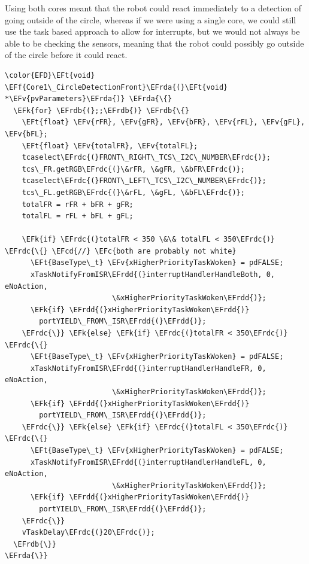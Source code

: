 \documentclass[11pt]{article}
\newcommand{\EFc}[1]{\textcolor{EFc}{#1}} %
\newcommand{\EFcd}[1]{\textcolor{EFcd}{#1}} %
\newcommand{\EFk}[1]{\textcolor{EFk}{#1}} %
\newcommand{\EFf}[1]{\textcolor{EFf}{#1}} %
\newcommand{\EFv}[1]{\textcolor{EFv}{#1}} %
\newcommand{\EFt}[1]{\textcolor{EFt}{#1}} %
\newcommand{\EFrda}[1]{\textcolor{EFrda}{#1}} %
\newcommand{\EFrdb}[1]{\textcolor{EFrdb}{#1}} %
\newcommand{\EFrdc}[1]{\textcolor{EFrdc}{#1}} %
\newcommand{\EFrdd}[1]{\textcolor{EFrdd}{#1}} %
\begin{document}
Using both cores meant that the robot could react immediately to a detection of going outside of the circle, whereas if we were using a single core, we could still use the task based approach to allow for interrupts, but we would not always be able to be checking the sensors, meaning that the robot could possibly go outside of the circle before it could react.
\begin{listing}[htbp]
\begin{Code}
\begin{Verbatim}
\color{EFD}\EFt{void} \EFf{Core1\_CircleDetectionFront}\EFrda{(}\EFt{void} *\EFv{pvParameters}\EFrda{)} \EFrda{\{}
  \EFk{for} \EFrdb{(};;\EFrdb{)} \EFrdb{\{}
    \EFt{float} \EFv{rFR}, \EFv{gFR}, \EFv{bFR}, \EFv{rFL}, \EFv{gFL}, \EFv{bFL};
    \EFt{float} \EFv{totalFR}, \EFv{totalFL};
    tcaselect\EFrdc{(}FRONT\_RIGHT\_TCS\_I2C\_NUMBER\EFrdc{)};
    tcs\_FR.getRGB\EFrdc{(}\&rFR, \&gFR, \&bFR\EFrdc{)};
    tcaselect\EFrdc{(}FRONT\_LEFT\_TCS\_I2C\_NUMBER\EFrdc{)};
    tcs\_FL.getRGB\EFrdc{(}\&rFL, \&gFL, \&bFL\EFrdc{)};
    totalFR = rFR + bFR + gFR;
    totalFL = rFL + bFL + gFL;

    \EFk{if} \EFrdc{(}totalFR < 350 \&\& totalFL < 350\EFrdc{)} \EFrdc{\{} \EFcd{//} \EFc{both are probably not white}
      \EFt{BaseType\_t} \EFv{xHigherPriorityTaskWoken} = pdFALSE;
      xTaskNotifyFromISR\EFrdd{(}interruptHandlerHandleBoth, 0, eNoAction,
                         \&xHigherPriorityTaskWoken\EFrdd{)};
      \EFk{if} \EFrdd{(}xHigherPriorityTaskWoken\EFrdd{)}
        portYIELD\_FROM\_ISR\EFrdd{(}\EFrdd{)};
    \EFrdc{\}} \EFk{else} \EFk{if} \EFrdc{(}totalFR < 350\EFrdc{)} \EFrdc{\{}
      \EFt{BaseType\_t} \EFv{xHigherPriorityTaskWoken} = pdFALSE;
      xTaskNotifyFromISR\EFrdd{(}interruptHandlerHandleFR, 0, eNoAction,
                         \&xHigherPriorityTaskWoken\EFrdd{)};
      \EFk{if} \EFrdd{(}xHigherPriorityTaskWoken\EFrdd{)}
        portYIELD\_FROM\_ISR\EFrdd{(}\EFrdd{)};
    \EFrdc{\}} \EFk{else} \EFk{if} \EFrdc{(}totalFL < 350\EFrdc{)} \EFrdc{\{}
      \EFt{BaseType\_t} \EFv{xHigherPriorityTaskWoken} = pdFALSE;
      xTaskNotifyFromISR\EFrdd{(}interruptHandlerHandleFL, 0, eNoAction,
                         \&xHigherPriorityTaskWoken\EFrdd{)};
      \EFk{if} \EFrdd{(}xHigherPriorityTaskWoken\EFrdd{)}
        portYIELD\_FROM\_ISR\EFrdd{(}\EFrdd{)};
    \EFrdc{\}}
    vTaskDelay\EFrdc{(}20\EFrdc{)};
  \EFrdb{\}}
\EFrda{\}}

\end{Verbatim}
\end{Code}
\caption{The task running on Core 1, which handles the edge detection sensors/logic}
\end{listing}
\clearpage
\end{document}
